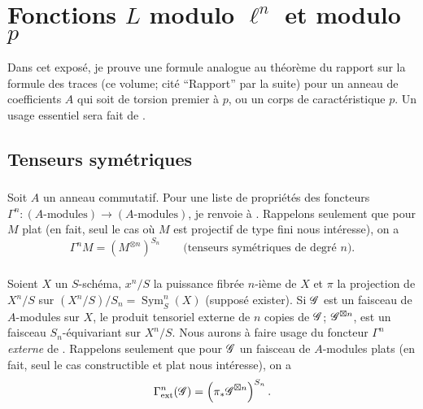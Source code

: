 
\chapter{Fonctions \texorpdfstring{$L$}{L} modulo \texorpdfstring{$\ell^n$}{l n} et modulo \texorpdfstring{$p$}{p}}\label{III}

Dans cet expos\'e, je prouve une formule analogue au th\'eor\`eme du rapport sur 
la formule des traces (ce volume; cit\'e ``Rapport'' par la suite) pour un 
anneau de coefficients $A$ qui soit de torsion premier \`a $p$, ou un corps de 
caract\'eristique $p$. Un usage essentiel sera fait de \cite[XVII 5.5]{sga4}. 










\section{Tenseurs sym\'etriques}\label{III:1}





\subsection{}\label{III:1-1}

Soit $A$ un anneau commutatif. Pour une liste de propri\'et\'es des foncteurs 
$\Gamma^n:(\text{$A$-modules})\to (\text{$A$-modules})$, je renvoie \`a 
\cite[XVII 5.5.1 et 2]{sga4}. Rappelons seulement que pour $M$ plat (en fait, seul 
le cas o\`u $M$ est projectif de type fini nous int\'eresse), on a 
\[
  \Gamma^n M = \left(M^{\otimes n}\right)^{S_n} \qquad \text{(tenseurs sym\'etriques de degr\'e $n$).}
\]





\subsection{}\label{III:1-2}

Soient $X$ un $S$-sch\'ema, $x^n/S$ la puissance fibr\'ee $n$-i\`eme de $X$ et 
$\pi$ la projection de $X^n/S$ sur $(X^n/S)/S_n=\operatorname{Sym}_S^n(X)$ 
(suppos\'e exister). Si $\mathscr{G}$ est un faisceau de $A$-modules sur $X$, le 
produit tensoriel externe de $n$ copies de $\mathscr{G}$; $\mathscr{G}^{\boxtimes n}$, est un 
faisceau $S_n$-\'equivariant sur $X^n/S$. Nous aurons \`a faire usage du 
foncteur $\Gamma^n$ \emph{externe} de \cite[XVII 5.5.7 \`a 9]{sga4}. Rappelons 
seulement que pour $\mathscr{G}$ un faisceau de $A$-modules plats (en fait, seul le cas 
constructible et plat nous int\'eresse), on a 
\[
  \Gamma_\text{ext}^n(\mathscr{G}) = \left(\pi_*\mathscr{G}^{\boxtimes n}\right)^{S_n} \text{.}
\]





